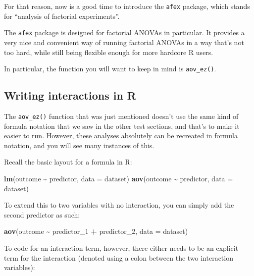 \documentclass[
]{book}
\newenvironment{Shaded}{\begin{snugshade}}{\end{snugshade}}
\newcommand{\AttributeTok}[1]{\textcolor[rgb]{0.13,0.29,0.53}{#1}}
\newcommand{\FunctionTok}[1]{\textcolor[rgb]{0.13,0.29,0.53}{\textbf{#1}}}
\newcommand{\NormalTok}[1]{#1}
\newcommand{\SpecialCharTok}[1]{\textcolor[rgb]{0.81,0.36,0.00}{\textbf{#1}}}
\begin{document}
For that reason, now is a good time to introduce the \texttt{afex} package, which stands for ``analysis of factorial experiments''.

The \texttt{afex} package is designed for factorial ANOVAs in particular. It provides a very nice and convenient way of running factorial ANOVAs in a way that's not too hard, while still being flexible enough for more hardcore R users.

In particular, the function you will want to keep in mind is \texttt{aov\_ez()}.

\subsection{Writing interactions in R}\label{writing-interactions-in-r}

The \texttt{aov\_ez()} function that was just mentioned doesn't use the same kind of formula notation that we saw in the other test sections, and that's to make it easier to run. However, these analyses absolutely can be recreated in formula notation, and you will see many instances of this.

Recall the basic layout for a formula in R:

\begin{Shaded}
\begin{Highlighting}[]
\FunctionTok{lm}\NormalTok{(outcome }\SpecialCharTok{\textasciitilde{}}\NormalTok{ predictor, }\AttributeTok{data =}\NormalTok{ dataset)}
\FunctionTok{aov}\NormalTok{(outcome }\SpecialCharTok{\textasciitilde{}}\NormalTok{ predictor, }\AttributeTok{data =}\NormalTok{ dataset)}
\end{Highlighting}
\end{Shaded}

To extend this to two variables with no interaction, you can simply add the second predictor as such:

\begin{Shaded}
\begin{Highlighting}[]
\FunctionTok{aov}\NormalTok{(outcome }\SpecialCharTok{\textasciitilde{}}\NormalTok{ predictor\_1 }\SpecialCharTok{+}\NormalTok{ predictor\_2, }\AttributeTok{data =}\NormalTok{ dataset)}
\end{Highlighting}
\end{Shaded}

To code for an interaction term, however, there either needs to be an explicit term for the interaction (denoted using a colon between the two interaction variables):
\end{document}
